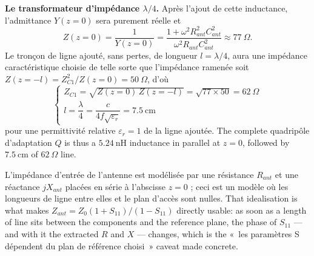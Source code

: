 \begin{example}[Antenne à $1\ \mathrm{GHz}$, $S_{11} = 0.3\,e^{-j60^{\circ}}$, $Z_0 = 50\ \Omega$]
  \medskip
  \textbf{Le transformateur d'impédance $\lambda/4$.} Après l'ajout de cette
  inductance, l'admittance $Y(z=0)$ sera purement réelle et
  \[Z(z=0) = \frac{1}{Y(z=0)}
    = \frac{1 + \omega^2 R_{ant}^2 C_{ant}^2}{\omega^2 R_{ant} C_{ant}^2}
    \approx 77\ \Omega.\]
  Le tronçon de ligne ajouté, sans pertes, de longueur $l = \lambda/4$, aura une
  impédance caractéristique choisie de telle sorte que l'impédance ramenée soit
  $Z(z=-l) = Z_{C1}^2/Z(z=0) = 50\ \Omega$, d'où
  \[\begin{cases}
      Z_{C1} = \sqrt{Z(z=0)\,Z(z=-l)} = \sqrt{77 \times 50} = 62\ \Omega \\[1ex]
      l = \dfrac{\lambda}{4} = \dfrac{c}{4 f \sqrt{\varepsilon_r}} = 7.5\ \mathrm{cm}
    \end{cases}\]
  pour une permittivité relative $\varepsilon_r = 1$ de la ligne ajoutée. The complete
  quadripôle d'adaptation $Q$ is thus a $5.24\ \mathrm{nH}$ inductance in parallel at
  $z = 0$, followed by $7.5\ \mathrm{cm}$ of $62\ \Omega$ line.
\end{example}

\begin{remark}
  L'impédance d'entrée de l'antenne est modélisée par une résistance $R_{ant}$ et une
  réactance $jX_{ant}$ placées en série à l'abscisse $z = 0$ ; ceci est un modèle où les
  longueurs de ligne entre elles et le plan d'accès sont nulles. That idealisation is
  what makes $Z_{ant} = Z_0(1+S_{11})/(1-S_{11})$ directly usable: as soon as a length of line
  sits between the components and the reference plane, the phase of $S_{11}$ --- and
  with it the extracted $R$ and $X$ --- changes, which is the «~les paramètres S
  dépendent du plan de référence choisi~» caveat made concrete.
\end{remark}
